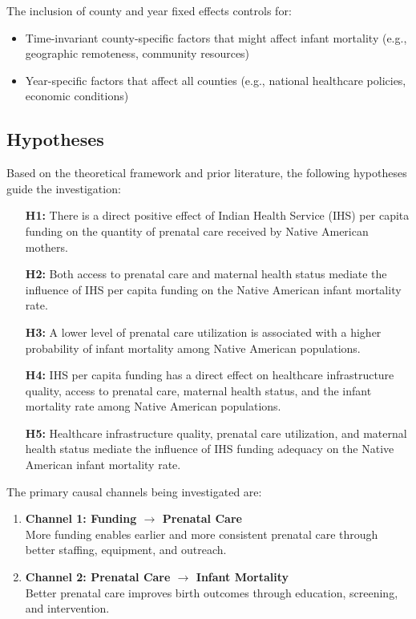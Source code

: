 \documentclass[12pt]{article}
\begin{document}
The inclusion of county and year fixed effects controls for:
\begin{itemize}
    \item Time-invariant county-specific factors that might affect infant mortality (e.g., geographic remoteness, community resources)
    \item Year-specific factors that affect all counties (e.g., national healthcare policies, economic conditions)
\end{itemize}

\subsection{Hypotheses}

Based on the theoretical framework and prior literature, the following hypotheses guide the investigation:

\begin{enumerate}
    \item[\textbf{H1:}] There is a direct positive effect of Indian Health Service (IHS) per capita funding on the quantity of prenatal care received by Native American mothers.
    \item[\textbf{H2:}] Both access to prenatal care and maternal health status mediate the influence of IHS per capita funding on the Native American infant mortality rate.
    \item[\textbf{H3:}] A lower level of prenatal care utilization is associated with a higher probability of infant mortality among Native American populations.
    \item[\textbf{H4:}] IHS per capita funding has a direct effect on healthcare infrastructure quality, access to prenatal care, maternal health status, and the infant mortality rate among Native American populations.
    \item[\textbf{H5:}] Healthcare infrastructure quality, prenatal care utilization, and maternal health status mediate the influence of IHS funding adequacy on the Native American infant mortality rate.
\end{enumerate}

The primary causal channels being investigated are:

\begin{enumerate}
    \item \textbf{Channel 1: Funding $\rightarrow$ Prenatal Care}\\
    More funding enables earlier and more consistent prenatal care through better staffing, equipment, and outreach.
    
    \item \textbf{Channel 2: Prenatal Care $\rightarrow$ Infant Mortality}\\
    Better prenatal care improves birth outcomes through education, screening, and intervention.
\end{enumerate}
\end{document}
